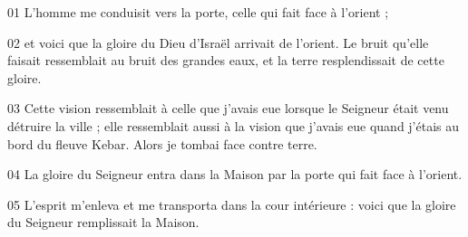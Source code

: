 01 L’homme me conduisit vers la porte, celle qui fait face à l’orient ;

02 et voici que la gloire du Dieu d’Israël arrivait de l’orient. Le bruit qu’elle faisait ressemblait au bruit des grandes eaux, et la terre resplendissait de cette gloire. 

03 Cette vision ressemblait à celle que j’avais eue lorsque le Seigneur était venu détruire la ville ; elle ressemblait aussi à la vision que j’avais eue quand j’étais au bord du fleuve Kebar. Alors je tombai face contre terre.

04 La gloire du Seigneur entra dans la Maison par la porte qui fait face à l’orient.

05 L’esprit m’enleva et me transporta dans la cour intérieure : voici que la gloire du Seigneur remplissait la Maison.

